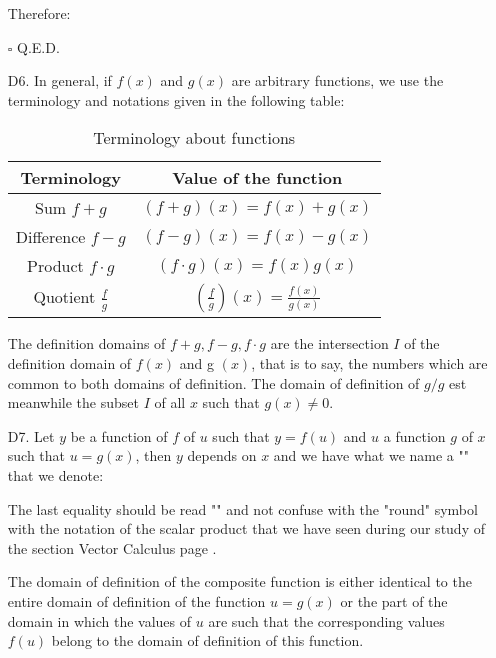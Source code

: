 \begin{enumerate}
\begin{dem}
		Therefore:
		
		\begin{flushright}
			$\square$  Q.E.D.
		\end{flushright}
		\end{dem}
		\item[D6.] In general, if $f (x)$ and $g (x)$ are arbitrary functions, we use the terminology and notations given in the following table:
		\begin{table}[H]	
			\begin{center}
				\begin{tabular}{|c|c|}
				\hline
				  \rowcolor[gray]{0.75}Terminology&Value of the function\\
				  \hline
				  Sum $f+g$ & $(f+g)(x)=f(x)+g(x)$ \\\hline
				  Difference $f-g$ & $(f-g)(x)=f(x)-g(x)$ \\\hline
				  Product $f \cdot g$ & $(f \cdot g)(x)=f(x)g(x)$ \\\hline
				  Quotient $\displaystyle\frac{f}{g}$&$\left(\displaystyle\frac{f}{g}\right)(x)=\displaystyle\frac{f(x)}{g(x)}$ \\\hline
				\end{tabular}
			\end{center}
			\caption{Terminology about functions}
		\end{table}
		The definition domains of $f+g,f-g,f\cdot g$ are the intersection $I$ of the definition domain of $f (x)$ and g $(x)$, that is to say, the numbers which are common to both domains of definition. The domain of definition of $g/g$ est meanwhile the subset $I$ of all $x$ such that  $g(x)\neq 0$.
		
		\item[D7.] Let $y$ be a function of $f$ of $u$ such that $y=f(u)$ and $u$ a function $g$ of $x$ such that $u=g(x)$, then $y$ depends on $x$ and we have what we name a "\label{composite function}" that we denote:
		
		The last equality should be read "" and not confuse with the "round" symbol with the notation of the scalar product that we have seen during our study of the section Vector Calculus page \pageref{dot product}.
		
		The domain of definition of the composite function is either identical to the entire domain of definition of the function $u=g(x)$ or the part of the domain in which the values of $u$ are such that the corresponding values $f (u)$ belong to the domain of definition of this function.
		

\end{enumerate}
